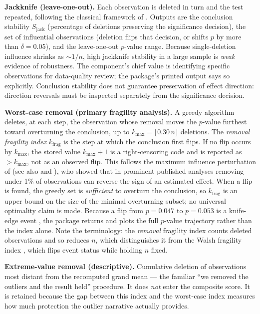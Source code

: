 \textbf{Jackknife (leave-one-out).} Each observation is deleted in turn and the
test repeated, following the classical framework of \citet{shaotu1995}. Outputs are
the conclusion stability \(S_\mathrm{jack}\) (percentage of deletions preserving
the significance decision), the set of influential observations (deletion
flips that decision, or shifts \(p\) by more than \(\delta = 0.05\)), and the leave-one-out
\(p\)-value range. Because single-deletion influence shrinks as \(\sim 1/n\), high
jackknife stability in a large sample is \emph{weak} evidence of robustness. The
component's chief value is identifying specific observations for data-quality
review; the package's printed output says so explicitly. Conclusion stability
does not guarantee preservation of effect direction: direction reversals must
be inspected separately from the significance decision.

\textbf{Worst-case removal (primary fragility analysis).} A greedy algorithm
deletes, at each step, the observation whose removal moves the \(p\)-value
furthest toward overturning the conclusion, up to
\(k_{\max} = \lfloor 0.30\,n \rfloor\) deletions. The \emph{removal fragility index}
\(k_\mathrm{frag}\) is the step at which the conclusion first flips. If no flip
occurs by \(k_{\max}\), the stored value \(k_{\max}+1\) is a right-censoring code
and is reported as \(>k_{\max}\), not as an observed flip. This
follows the maximum influence perturbation of \citet{broderick2023} (see also
\citet{giordano2026a} and \citet{giordano2026b}), who showed that in prominent published
analyses removing under 1\% of observations can reverse the sign of an
estimated effect. When a flip is found, the greedy set is \emph{sufficient} to
overturn the conclusion, so \(k_\mathrm{frag}\) is an upper bound on the size of
the minimal overturning subset; no universal optimality claim is made. Because
a flip from \(p = 0.047\) to \(p = 0.053\) is a knife-edge
event \citep{potter2020}, the package returns and plots the full \(p\)-value
trajectory rather than the index alone. Note the terminology: the \emph{removal}
fragility index counts deleted observations and so reduces \(n\), which
distinguishes it from the Walsh fragility index \citep{walsh2014}, which flips
event status while holding \(n\) fixed.

\textbf{Extreme-value removal (descriptive).} Cumulative deletion of observations
most distant from the recomputed grand mean --- the familiar ``we removed the
outliers and the result held'' procedure. It does \emph{not} enter the composite
score. It is retained because the gap between this index and the worst-case
index measures how much protection the outlier narrative actually provides.

